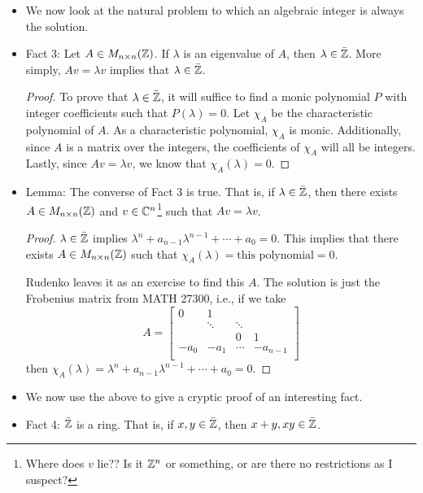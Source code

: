 \documentclass[../notes.tex]{subfiles}
\begin{document}
\begin{itemize}
    \item We now look at the natural problem to which an algebraic integer is always the solution.
    \item Fact 3: Let $A\in M_{n\times n}(\mathbb{Z})$. If $\lambda$ is an eigenvalue of $A$, then $\lambda\in\bar{\mathbb{Z}}$. More simply, $Av=\lambda v$ implies that $\lambda\in\bar{\mathbb{Z}}$.
    \begin{proof}
        To prove that $\lambda\in\bar{\mathbb{Z}}$, it will suffice to find a monic polynomial $P$ with integer coefficients such that $P(\lambda)=0$. Let $\chi_A$ be the characteristic polynomial of $A$. As a characteristic polynomial, $\chi_A$ is monic. Additionally, since $A$ is a matrix over the integers, the coefficients of $\chi_A$ will all be integers. Lastly, since $Av=\lambda v$, we know that $\chi_A(\lambda)=0$.
    \end{proof}
    \item Lemma: The converse of Fact 3 is true. That is, if $\lambda\in\bar{\mathbb{Z}}$, then there exists $A\in M_{n\times n}(\mathbb{Z})$ and $v\in\mathbb{C}^n$\footnote{Where does $v$ lie?? Is it $\mathbb{Z}^n$ or something, or are there no restrictions as I suspect?} such that $Av=\lambda v$.
    \begin{proof}
        $\lambda\in\bar{\mathbb{Z}}$ implies $\lambda^n+a_{n-1}\lambda^{n-1}+\cdots+a_0=0$. This implies that there exists $A\in M_{n\times n}(\mathbb{Z})$ such that $\chi_A(\lambda)=\text{this polynomial}=0$.\par
        Rudenko leaves it as an exercise to find this $A$. The solution is just the Frobenius matrix from MATH 27300, i.e., if we take
        \begin{equation*}
            A =
            \begin{bmatrix}
                0 & 1 &  & \\
                 & \ddots & \ddots & \\
                 &  & 0 & 1\\
                -a_0 & -a_1 & \cdots & -a_{n-1}\\
            \end{bmatrix}
        \end{equation*}
        then $\chi_A(\lambda)=\lambda^n+a_{n-1}\lambda^{n-1}+\cdots+a_0=0$.
    \end{proof}
    \item We now use the above to give a cryptic proof of an interesting fact.
    \item Fact 4: $\bar{\mathbb{Z}}$ is a ring. That is, if $x,y\in\bar{\mathbb{Z}}$, then $x+y,xy\in\bar{\mathbb{Z}}$.

\end{itemize}
\end{document}
